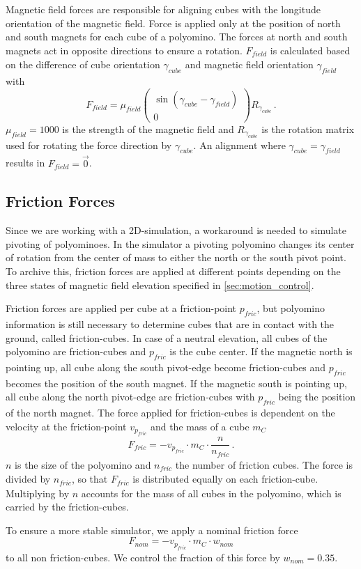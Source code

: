 Magnetic field forces are responsible for aligning cubes with the longitude orientation of the magnetic field.
Force is applied only at the position of north and south magnets for each cube of a polyomino.
The forces at north and south magnets act in opposite directions to ensure a rotation.
$F_\textit{field}$ is calculated based on the difference of cube orientation $\gamma_\textit{cube}$ and magnetic field orientation $\gamma_\textit{field}$ with
\begin{equation}
F_\textit{field} = \mu_\textit{field} \begin{pmatrix} \sin(\gamma_\textit{cube} - \gamma_\textit{field}) \\ 0 \end{pmatrix} R_{\gamma_\textit{cube}} \, .
\end{equation}
$\mu_\textit{field} = 1000$ is the strength of the magnetic field and $R_{\gamma_\textit{cube}}$ is the rotation matrix used for rotating the force direction by $\gamma_\textit{cube}$.
An alignment where $\gamma_\textit{cube} = \gamma_\textit{field}$ results in $F_\textit{field} = \vec{0}$.


\subsection{Friction Forces}
\label{sec:force_friction}

Since we are working with a 2D-simulation, a workaround is needed to simulate pivoting of polyominoes.
In the simulator a pivoting polyomino changes its center of rotation from the center of mass to either the north or the south pivot point.
To archive this, friction forces are applied at different points depending on the three states of magnetic field elevation specified in \autoref{sec:motion_control}.

Friction forces are applied per cube at a friction-point $p_\textit{fric}$, but polyomino information is still necessary to determine cubes that are in contact with the ground, called friction-cubes.
In case of a neutral elevation, all cubes of the polyomino are friction-cubes and $p_\textit{fric}$ is the cube center.
If the magnetic north is pointing up, all cube along the south pivot-edge become friction-cubes and $p_\textit{fric}$ becomes the position of the south magnet.
If the magnetic south is pointing up, all cube along the north pivot-edge are friction-cubes with $p_\textit{fric}$ being the position of the north magnet.
The force applied for friction-cubes is dependent on the velocity at the friction-point $v_{p_\textit{fric}}$ and the mass of a cube $m_C$
\begin{equation}
F_\textit{fric} = -v_{p_\textit{fric}} \cdot m_C \cdot \frac{n}{n_\textit{fric}} \, .
\end{equation}
$n$ is the size of the polyomino and $n_\textit{fric}$ the number of friction cubes.
The force is divided by $n_\textit{fric}$, so that $F_\textit{fric}$ is distributed equally on each friction-cube.
Multiplying by $n$ accounts for the mass of all cubes in the polyomino, which is carried by the friction-cubes.

To ensure a more stable simulator, we apply a nominal friction force
\begin{equation}
F_\textit{nom} = -v_{p_\textit{fric}} \cdot m_C \cdot w_\textit{nom}
\end{equation}
to all non friction-cubes.
We control the fraction of this force by $w_\textit{nom} = 0.35$.


